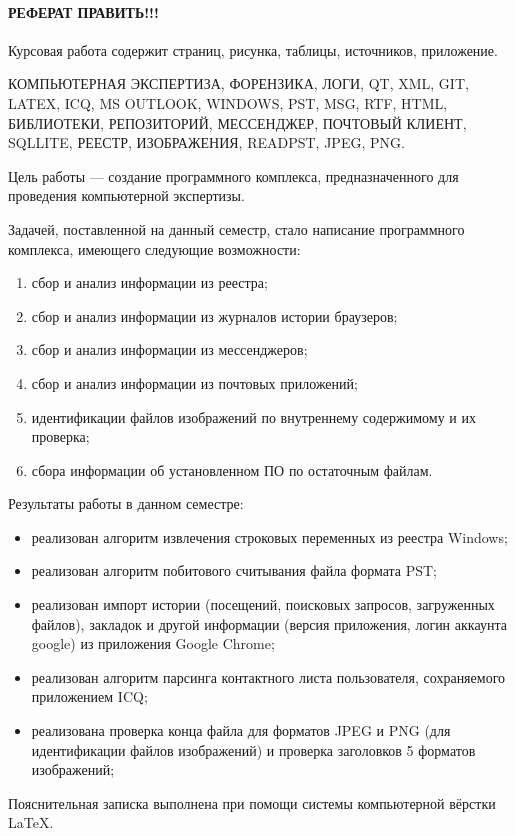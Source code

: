 \newpage
{}
\paragraph{\hfill РЕФЕРАТ \textbf{ПРАВИТЬ!!!} \hfill}
Курсовая работа содержит  страниц,  рисунка,  таблицы,  источников,  приложение.

КОМПЬЮТЕРНАЯ ЭКСПЕРТИЗА, ФОРЕНЗИКА, ЛОГИ, QT, XML, GIT, LATEX, ICQ, MS OUTLOOK, WINDOWS, PST, MSG, RTF, HTML, БИБЛИОТЕКИ, РЕПОЗИТОРИЙ, МЕССЕНДЖЕР, ПОЧТОВЫЙ КЛИЕНТ, SQLLITE, РЕЕСТР, ИЗОБРАЖЕНИЯ, READPST, JPEG, PNG.

Цель работы --- создание программного комплекса, предназначенного для проведения компьютерной экспертизы.

Задачей, поставленной на данный семестр, стало написание программного комплекса, имеющего следующие возможности: 
\begin{enumerate}
\item сбор и анализ информации из реестра;
\item сбор и анализ информации из журналов истории браузеров;
\item сбор и анализ информации из мессенджеров;
\item сбор и анализ информации из почтовых приложений;
\item идентификации файлов изображений по внутреннему содержимому и их проверка;
\item сбора информации об установленном ПО по остаточным файлам.
\end{enumerate}

Результаты работы в данном семестре:

\begin{itemize}
\item реализован алгоритм извлечения строковых переменных из реестра Windows;
\item реализован алгоритм побитового считывания файла формата PST;
\item реализован импорт истории (посещений, поисковых запросов, загруженных файлов), закладок и 
другой информации (версия приложения, логин аккаунта google) из приложения Google Chrome;
\item реализован алгоритм парсинга контактного листа пользователя, сохраняемого приложением ICQ;
\item реализована проверка конца файла для форматов JPEG и PNG (для идентификации файлов изображений) и проверка заголовков 5 форматов изображений;
\end{itemize}

Пояснительная записка выполнена при помощи системы компьютерной вёрстки \LaTeX.
